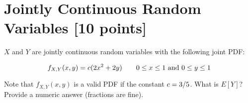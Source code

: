 \newpage
\section{Jointly Continuous Random Variables [10 points]}

$X$ and $Y$ are jointly continuous random variables with the following joint PDF:

\begin{equation}
f_{X,Y}(x,y) = c(2{} x^2 + 2{} y) \qquad 0 \leq x\leq 1{} \text{ and } 0 \leq y \leq 1{}
\end{equation}

Note that $f_{X,Y}(x,y)$ is a valid PDF if the constant $c = 3{}/5{}$. What is $E[Y]$? Provide a numeric answer (fractions are fine).
	
		
		

